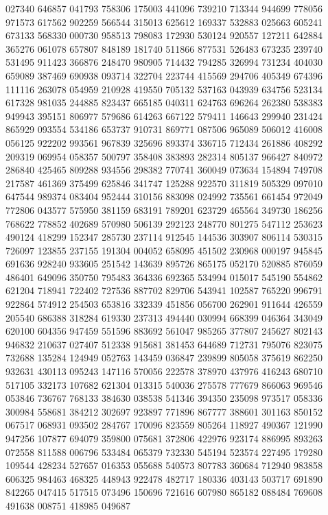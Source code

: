 {027340 646857 041793 758306 175003 441096 739210 713344 944699 778056 971573%
617562 902259 566544 315013 625612 169337 532883 025663 605241 673133 568330%
000730 958513 798083 172930 530124 920557 127211 642884 365276 061078 657807%
848189 181740 511866 877531 526483 673235 239740 531495 911423 366876 248470%
980905 714432 794285 326994 731234 404030 659089 387469 690938 093714 322704%
223744 415569 294706 405349 674396 111116 263078 054959 210928 419550 705132%
537163 043939 634756 523134 617328 981035 244885 823437 665185 040311 624763%
696264 262380 538383 949943 395151 806977 579686 614263 667122 579411 146643%
299940 231424 865929 093554 534186 653737 910731 869771 087506 965089 506012%
416008 056125 922202 993561 967839 325696 893374 336715 712434 261886 408292%
209319 069954 058357 500797 358408 383893 282314 805137 966427 840972 286840%
425465 809288 934556 298382 770741 360049 073634 154894 749708 217587 461369%
375499 625846 341747 125288 922570 311819 505329 097010 647544 989374 083404%
952444 310156 883098 024992 735561 661454 972049 772806 043577 575950 381159%
683191 789201 623729 465564 349730 186256 768622 778852 402689 570980 506139%
292123 248770 801275 547112 253623 490124 418299 152347 285730 237114 912545%
144536 303907 806114 530315 726097 123855 237155 191304 004052 658095 451502%
230968 000197 945845 691636 928240 933605 251542 143639 895726 865175 052170%
520885 876059 486401 649096 350750 795483 364336 692365 534994 015017 545190%
554862 621204 718941 722402 727536 887702 829706 543941 102587 765220 996791%
922864 574912 254503 653816 332339 451856 056700 262901 911644 426559 205540%
686388 318284 619330 237313 494440 030994 668399 046364 343049 620100 604356%
947459 551596 883692 561047 985265 377807 245627 802143 946832 210637 027407%
512338 915681 381453 644689 712731 795076 823075 732688 135284 124949 052763%
143459 036847 239899 805058 375619 862250 932631 430113 095243 147116 570056%
222578 378970 437976 416243 680710 517105 332173 107682 621304 013315 540036%
275578 777679 866063 969546 053846 736767 768133 384630 038538 541346 394350%
235098 973517 058336 300984 558681 384212 302697 923897 771896 867777 388601%
301163 850152 067517 068931 093502 284767 170096 823559 805264 118927 490367%
121990 947256 107877 694079 359800 075681 372806 422976 923174 886995 893263%
072558 811588 006796 533484 065379 732330 545194 523574 227495 179280 109544%
428234 527657 016353 055688 540573 807783 360684 712940 983858 606325 984463%
468325 448943 922478 482717 180336 403143 503717 691890 842265 047415 517515%
073496 150696 721616 607980 865182 088484 769608 491638 008751 418985 049687%
}
